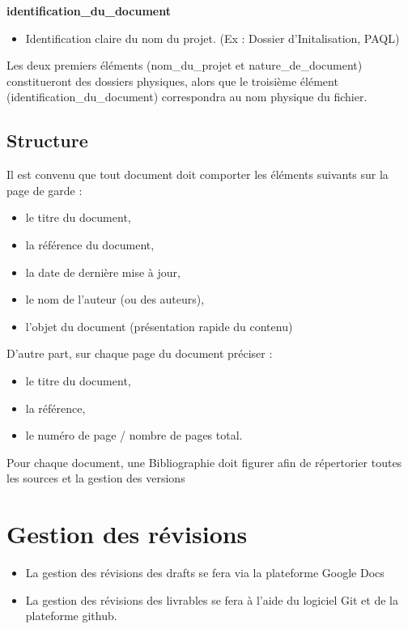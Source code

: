 \documentclass{mise_en_page}
\begin{document}
\textbf{identification\_du\_document}

\begin{itemize}
\item Identification claire du nom du projet. (Ex : Dossier
d’Initalisation, PAQL)
\end{itemize}



Les deux premiers éléments (nom\_du\_projet et nature\_de\_document)
constitueront des dossiers physiques, alors que le troisième élément
(identification\_du\_document) correspondra au nom physique du fichier.




\subsection{Structure}
Il est convenu que tout document doit comporter les éléments suivants
sur la page de garde :

\begin{itemize}
\item le titre du document,
\item la référence du document,
\item la date de dernière mise à jour,
\item le nom de l’auteur (ou des auteurs),
\item l’objet du document (présentation rapide du contenu)
\end{itemize}



D’autre part, sur chaque page du document préciser :

\begin{itemize}
\item le titre du document,
\item la référence,
\item le numéro de page / nombre de pages total.
\end{itemize}



Pour chaque document, une Bibliographie doit figurer afin de répertorier
toutes les sources et la gestion des versions

\section{Gestion des révisions}



\begin{itemize}
\item La gestion des révisions des drafts se fera via la plateforme
Google Docs
\end{itemize}
\begin{itemize}
\item La gestion des révisions des livrables se fera à l’aide du
logiciel Git et de la plateforme github.
\end{itemize}
\end{document}
